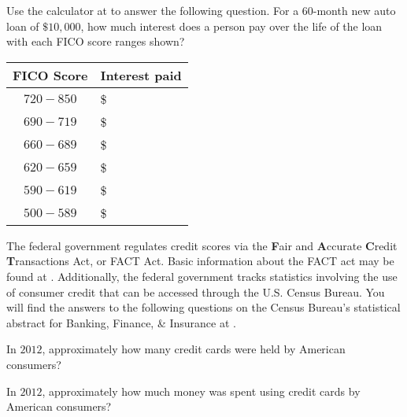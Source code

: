 \documentclass{ximera}
\begin{document}
\begin{question}
Use the calculator at  to answer the following question. For a 60-month new auto loan of $\$10,000$, how much interest does a person pay over the life of the loan with each FICO score ranges shown?

\begin{freeResponse}
\begin{tabular}{@{}cl@{}}\toprule
 \textbf{FICO Score} & \textbf{Interest paid}\\\midrule
$720-850$ & \$\\
$690-719$ & \$\\
$660-689$ & \$\\
$620-659$ & \$\\
$590-619$ & \$\\
$500-589$ & \$\\
\bottomrule
\end{tabular}
\end{freeResponse}
\end{question}

The federal government regulates credit scores via the \textbf{F}air and \textbf{A}ccurate \textbf{C}redit \textbf{T}ransactions Act, or FACT Act. Basic information about the FACT act may be found at . Additionally, the federal government tracks statistics involving the use of consumer credit that can be accessed through the U.S. Census Bureau. You will find the answers to the following questions on the Census Bureau's statistical abstract for Banking, Finance, \& Insurance at .


\begin{question}
In $2012$, approximately how many credit cards were held by American consumers?
    \begin{multipleChoice}
    \end{multipleChoice}
\end{question}

\begin{question}
In $2012$, approximately how much money was spent using credit cards by American consumers?
    \begin{multipleChoice}
    \end{multipleChoice}
\end{question}
\end{document}
